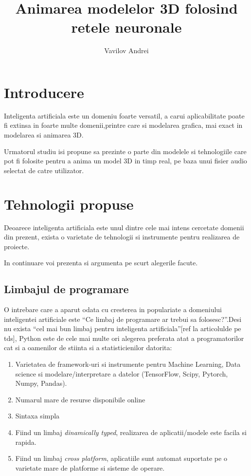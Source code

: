 \documentclass[a4paper]{article}
\author {Vavilov Andrei}
\title {Animarea modelelor 3D folosind retele neuronale}
\begin{document}
\maketitle

\section{Introducere}
    Inteligenta artificiala este un domeniu foarte versatil, a carui aplicabilitate poate fi extinsa in foarte multe
    domenii,printre care si modelarea grafica, mai exact in modelarea si animarea 3D.


    Urmatorul studiu isi propune sa prezinte o parte din modelele si tehnologiile care pot fi folosite pentru a
anima un model 3D in timp real, pe baza unui fisier audio selectat de catre utilizator.

\section{Tehnologii propuse}
Deoarece inteligenta artificiala este unul dintre cele mai intens cercetate domenii din prezent, exista o varietate de
tehnologii si instrumente pentru realizarea de proiecte.

In continuare voi prezenta si argumenta pe scurt alegerile facute.

\subsection{Limbajul de programare }
O intrebare care a aparut odata cu cresterea in populariate a domeniului inteligentei artificiale este
``Ce limbaj de programare ar trebui sa folosesc?''.Desi nu exista ``cel mai bun limbaj pentru inteligenta artificiala''[ref
la articolulde pe tds], Python este de cele mai multe ori alegerea preferata atat a programatorilor cat si a oamenilor
de stiinta si a statisticienilor datorita:
\begin{enumerate}
	\item Varietatea de framework-uri si instrumente pentru Machine Learning, Data science si modelare/interpretare
		a datelor (TensorFlow, Scipy, Pytorch, Numpy, Pandas).
	\item Numarul mare de resurse disponibile online
	\item Sintaxa simpla
	\item Fiind un limbaj \textit{dinamically typed}, realizarea de aplicatii/modele este facila si rapida.
	\item Fiind un limbaj \textit{cross platform}, aplicatiile sunt automat suportate pe o varietate mare de
		platforme si sisteme de operare.
\end{enumerate}
\end{document}
